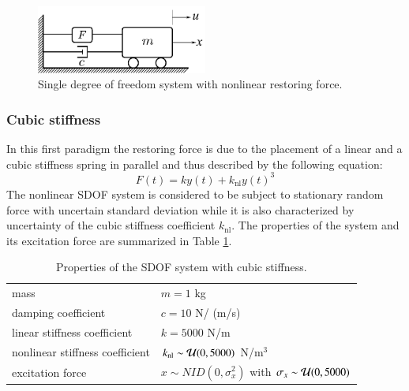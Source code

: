 \documentclass[preprint,3p,review,times,11pt]{elsarticle}
\newcommand{\beq}{\begin{equation}}
\newcommand{\eeq}{\end{equation}}
\begin{document}
\begin{figure}[t]
\centering\includegraphics[width = 0.5\textwidth]{figs/SDOF.pdf}
\caption{Single degree of freedom system with nonlinear restoring force.}\label{fig:SDOF}
\end{figure}



\subsubsection{Cubic stiffness}

In this first paradigm the restoring force is due to the placement of a linear and a cubic stiffness spring in parallel and thus described by the following equation: 
%
\beq F(t) = k{y}(t) + k_{\mathrm{nl}}{y}(t)^3  \label{eq:cubic_restoring}\eeq
%
The nonlinear SDOF system is considered to be subject to stationary random force with uncertain standard deviation while it is also characterized by uncertainty of the cubic stiffness coefficient $k_{\mathrm{nl}}$. The properties of the system and its excitation force are summarized in Table \ref{tab:cubic_prop}. 

\begin{table} 
\centering
\caption{Properties of the SDOF system with cubic stiffness.}\label{tab:cubic_prop}
\begin{tabular}{ll}\hline
mass & $m = 1$ kg \\
damping coefficient & $c = 10 $ N/ (m/s) \\
linear stiffness coefficient & $k = 5000 $ N/m\\
nonlinear stiffness coefficient & $k_{\mathrm{nl}} \sim {\cal U}(0,5000) $ N/m$^{3}$ \\
excitation force & $x\sim NID(0,\sigma_x^2)$ with $\sigma_x \sim {\cal U}(0,5000) $ \\ \hline
\end{tabular}
\end{table}
\end{document}

